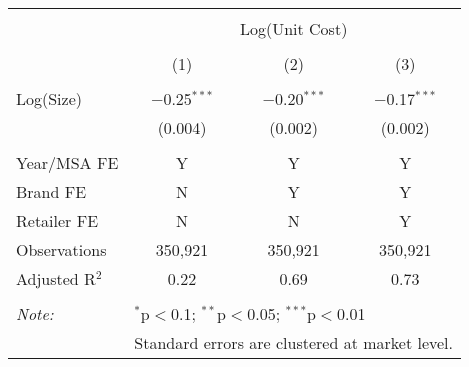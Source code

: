 
\begin{table}[!htbp] \centering 
  \caption{} 
  \label{tab:bulkDiscountUnitCost7270} 
\begin{tabular}{@{\extracolsep{5pt}}lccc} 
\\[-1.8ex]\hline 
\hline \\[-1.8ex] 
 & \multicolumn{3}{c}{Log(Unit Cost)} \\ 
\cline{2-4} 
\\[-1.8ex] & (1) & (2) & (3)\\ 
\hline \\[-1.8ex] 
 Log(Size) & $-$0.25$^{***}$ & $-$0.20$^{***}$ & $-$0.17$^{***}$ \\ 
  & (0.004) & (0.002) & (0.002) \\ 
 \hline \\[-1.8ex] 
Year/MSA FE & Y & Y & Y \\ 
Brand FE & N & Y & Y \\ 
Retailer FE & N & N & Y \\ 
Observations & 350,921 & 350,921 & 350,921 \\ 
Adjusted R$^{2}$ & 0.22 & 0.69 & 0.73 \\ 
\hline 
\hline \\[-1.8ex] 
\textit{Note:}  & \multicolumn{3}{l}{$^{*}$p$<$0.1; $^{**}$p$<$0.05; $^{***}$p$<$0.01} \\ 
 & \multicolumn{3}{l}{Standard errors are clustered at market level.} \\ 
\end{tabular} 
\end{table} 
